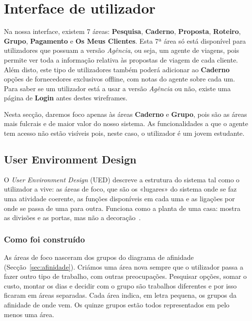 \section{Interface de utilizador}\label{sec:interface}

Na nossa interface, existem 7 áreas: \textbf{Pesquisa}, \textbf{Caderno}, \textbf{Proposta}, \textbf{Roteiro}, \textbf{Grupo}, \textbf{Pagamento} e \textbf{Os Meus Clientes}.
Esta 7ª área só está disponível para utilizadores que possuam a versão \textit{Agência}, ou seja, um agente de viagens, pois permite ver toda a informação relativa às propostas de viagem de cada cliente.
Além disto, este tipo de utilizadores também poderá adicionar ao \textbf{Caderno} opções de fornecedores exclusivos offline, com notas do agente sobre cada um.
Para saber se um utilizador está a usar a versão \textit{Agência} ou não, existe uma página de \textbf{Login} antes destes wireframes.

Nesta secção, daremos foco apenas às áreas \textbf{Caderno} e \textbf{Grupo}, pois são as áreas mais fulcrais e de maior valor do nosso sistema.
As funcionalidades a que o agente tem acesso não estão visíveis pois, neste caso, o utilizador é um jovem estudante.


\subsection{User Environment Design}\label{sec:ued}

O \textit{User Environment Design} (UED) descreve a estrutura do sistema tal como o
utilizador a vive: as áreas de foco, que são os «lugares» do sistema onde se faz uma
atividade coerente, as funções disponíveis em cada uma e as ligações por onde se passa
de uma para outra. Funciona como a planta de uma casa: mostra as divisões e as portas,
mas não a decoração~\cite{beyer1998}.

\subsubsection{Como foi construído}

As áreas de foco nasceram dos grupos do diagrama de afinidade
(Secção~\ref{sec:afinidade}). Criámos uma área nova sempre que o
utilizador passa a fazer outro tipo de trabalho, com outras preocupações. Pesquisar
opções, somar o custo, montar os dias e decidir com o grupo são trabalhos diferentes e
por isso ficaram em áreas separadas. Cada área indica, em letra pequena, os grupos da
afinidade de onde vem. Os quinze grupos estão todos representados em pelo menos uma área.

